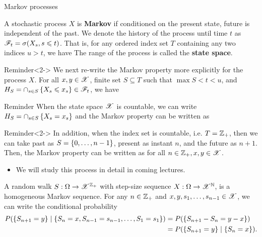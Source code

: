 \documentclass[12pt,aspectratio=169]{beamer}
\begin{document}
\begin{frame}{Markov processes}
\begin{Definition}
A stochastic process $X$ is \textbf{Markov} if conditioned on the present state, future is independent of the past. 
We denote the history of the process until time $t$ as $\mathscr{F}_t = \sigma(X_s, s \leqslant t)$. 
That is, for any ordered index set $T$ containing any two indices $u > t$, we have  %
The range of the process is called the \textbf{state space}. 
\end{Definition}
\begin{block}{Reminder}<2->
We next re-write the Markov property more explicitly for the process $X$. 
For all $x, y \in \mathscr{X}$, finite set $S \subseteq T$ such that $\max S < t < u$, and $H_S  = \cap_{s \in S}\left\{X_s \leqslant x_s\right\} \in \mathscr{F}_t$, we have 
\end{block}
\end{frame}


\begin{frame}
\begin{block}{Reminder}
When the state space $\mathscr{X}$ is countable, we can write $H_S = \cap_{s \in S}\left\{X_s = x_s\right\}$ and the Markov property can be written as 
\end{block}
\begin{block}{Reminder}<2->
In addition, when the index set is countable, i.e. $T = \mathbb{Z}_+$, then we can take past as $S = \left\{0, \dots, n-1\right\}$, 
present as instant $n$, and the future as $n+1$. 
Then, the Markov property can be written as 
for all $n \in \mathbb{Z}_+, x,y \in \mathscr{X}$. 
\end{block}
\begin{itemize}
  \item<3-> We will study this process in detail in coming lectures.  
\end{itemize} 
\end{frame}


\begin{frame}
\begin{Example}
A random walk $S:\Omega\to\mathscr{X}^{\mathbb{Z}_+}$ with \iid step-size sequence $X:\Omega\to\mathscr{X}^{\mathbb{N}}$, is a homogeneous Markov sequence. 
For any $n \in \mathbb{Z}_+$ and $x,y, s_1, \dots, s_{n-1} \in \mathscr{X}$, we can write the conditional probability 
\begin{align*}
P(\left\{S_{n+1} = y\right\}\mid\left\{S_n = x, S_{n-1} = s_{n-1}, \dots, S_1 = s_1\right\}) 
&= P(\left\{S_{n+1} - S_n = y-x\right\}) \\
&=  P(\left\{S_{n+1} = y\right\}\mid\left\{S_n = x\right\}).
\end{align*}
\end{Example}
\end{frame}
\end{document}
